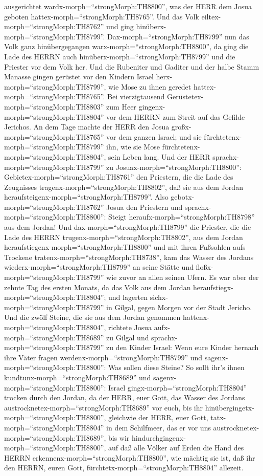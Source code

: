 ausgerichtet wardx-morph=``strongMorph:TH8800'', was der HERR dem Josua
geboten hattex-morph=``strongMorph:TH8765''. Und das Volk
eiltex-morph=``strongMorph:TH8762'' und ging
hinüberx-morph=``strongMorph:TH8799''. 
Dax-morph=``strongMorph:TH8799'' nun das Volk ganz hinübergegangen
warx-morph=``strongMorph:TH8800'', da ging die Lade des HERRN auch
hinüberx-morph=``strongMorph:TH8799'' und die Priester vor dem Volk her.
 Und die Rubeniter und Gaditer und der halbe Stamm Manasse
gingen gerüstet vor den Kindern Israel
herx-morph=``strongMorph:TH8799'', wie Mose zu ihnen geredet
hattex-morph=``strongMorph:TH8765''.  Bei vierzigtausend
Gerüstetex-morph=``strongMorph:TH8803'' zum Heer
gingenx-morph=``strongMorph:TH8804'' vor dem HERRN zum Streit auf das
Gefilde Jerichos.  An dem Tage machte der HERR den Josua
großx-morph=``strongMorph:TH8765'' vor dem ganzen Israel; und sie
fürchtetenx-morph=``strongMorph:TH8799'' ihn, wie sie Mose
fürchtetenx-morph=``strongMorph:TH8804'', sein Leben lang. 
Und der HERR sprachx-morph=``strongMorph:TH8799'' zu
Josuax-morph=``strongMorph:TH8800'': 
Gebietex-morph=``strongMorph:TH8761'' den Priestern, die die Lade des
Zeugnisses tragenx-morph=``strongMorph:TH8802'', daß sie aus dem Jordan
heraufsteigenx-morph=``strongMorph:TH8799''.  Also
gebotx-morph=``strongMorph:TH8762'' Josua den Priestern und
sprachx-morph=``strongMorph:TH8800'': Steigt
heraufx-morph=``strongMorph:TH8798'' aus dem Jordan!  Und
dax-morph=``strongMorph:TH8799'' die Priester, die die Lade des HERRN
trugenx-morph=``strongMorph:TH8802'', aus dem Jordan
heraufstiegenx-morph=``strongMorph:TH8800'' und mit ihren Fußsohlen aufs
Trockene tratenx-morph=``strongMorph:TH8738'', kam das Wasser des
Jordans wiederx-morph=``strongMorph:TH8799'' an seine Stätte und
floßx-morph=``strongMorph:TH8799'' wie zuvor an allen seinen Ufern.
 Es war aber der zehnte Tag des ersten Monats, da das Volk
aus dem Jordan heraufstiegx-morph=``strongMorph:TH8804''; und lagerten
sichx-morph=``strongMorph:TH8799'' in Gilgal, gegen Morgen vor der Stadt
Jericho.  Und die zwölf Steine, die sie aus dem Jordan
genommen hattenx-morph=``strongMorph:TH8804'', richtete Josua
aufx-morph=``strongMorph:TH8689'' zu Gilgal  und
sprachx-morph=``strongMorph:TH8799'' zu den Kinder Israel: Wenn eure
Kinder hernach ihre Väter fragen werdenx-morph=``strongMorph:TH8799''
und sagenx-morph=``strongMorph:TH8800'': Was sollen diese Steine?
 So sollt ihr's ihnen kundtunx-morph=``strongMorph:TH8689''
und sagenx-morph=``strongMorph:TH8800'': Israel
gingx-morph=``strongMorph:TH8804'' trocken durch den Jordan,
 da der HERR, euer Gott, das Wasser des Jordans
austrocknetex-morph=``strongMorph:TH8689'' vor euch, bis ihr
hinübergingetx-morph=``strongMorph:TH8800'', gleichwie der HERR, euer
Gott, tatx-morph=``strongMorph:TH8804'' in dem Schilfmeer, das er vor
uns austrocknetex-morph=``strongMorph:TH8689'', bis wir
hindurchgingenx-morph=``strongMorph:TH8800'',  auf daß alle
Völker auf Erden die Hand des HERRN
erkennenx-morph=``strongMorph:TH8800'', wie mächtig sie ist, daß ihr den
HERRN, euren Gott, fürchtetx-morph=``strongMorph:TH8804'' allezeit.

